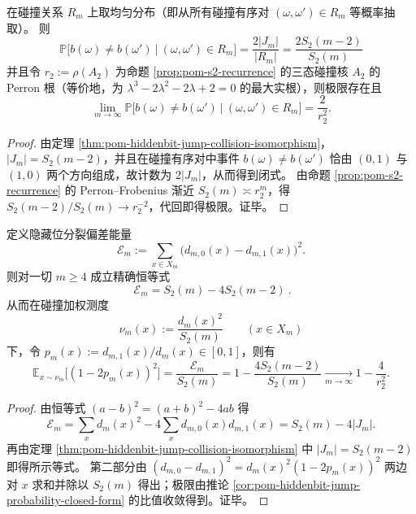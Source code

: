 \begin{corollary}[碰撞条件下的隐藏位跃迁概率闭式与代数极限]\label{cor:pom-hiddenbit-jump-probability-closed-form}
在碰撞关系 \(R_m\) 上取均匀分布（即从所有碰撞有序对 \((\omega,\omega')\in R_m\) 等概率抽取）。
则
\[
\boxed{\;
\mathbb{P}\bigl[b(\omega)\neq b(\omega')\ \big|\ (\omega,\omega')\in R_m\bigr]
=\frac{2|J_m|}{|R_m|}
=\frac{2S_2(m-2)}{S_2(m)}\;}
\]
并且令 \(r_2:=\rho(A_2)\) 为命题 \ref{prop:pom-s2-recurrence} 的三态碰撞核 \(A_2\) 的 Perron 根（等价地，为 \(\lambda^3-2\lambda^2-2\lambda+2=0\) 的最大实根），则极限存在且
\[
\lim_{m\to\infty}\mathbb{P}\bigl[b(\omega)\neq b(\omega')\ \big|\ (\omega,\omega')\in R_m\bigr]
=\frac{2}{r_2^2}.
\]
\end{corollary}
\begin{proof}
由定理 \ref{thm:pom-hiddenbit-jump-collision-isomorphism}，\(|J_m|=S_2(m-2)\)，并且在碰撞有序对中事件 \(b(\omega)\neq b(\omega')\) 恰由 \((0,1)\) 与 \((1,0)\) 两个方向组成，故计数为 \(2|J_m|\)，从而得到闭式。
由命题 \ref{prop:pom-s2-recurrence} 的 Perron--Frobenius 渐近 \(S_2(m)\asymp r_2^m\)，得 \(S_2(m-2)/S_2(m)\to r_2^{-2}\)，代回即得极限。证毕。
\end{proof}

\begin{theorem}[隐藏位分裂偏差能量的二阶守恒律]\label{thm:pom-hiddenbit-bias-energy-identity}
定义隐藏位分裂偏差能量
\[
\mathcal{E}_m:=\sum_{x\in X_m}\bigl(d_{m,0}(x)-d_{m,1}(x)\bigr)^2.
\]
则对一切 \(m\ge 4\) 成立精确恒等式
\[
\boxed{\ \mathcal{E}_m=S_2(m)-4S_2(m-2)\ }.
\]
从而在碰撞加权测度
\[
\nu_m(x):=\frac{d_m(x)^2}{S_2(m)}\qquad(x\in X_m)
\]
下，令 \(p_m(x):=d_{m,1}(x)/d_m(x)\in[0,1]\)，则有
\[
\mathbb{E}_{x\sim\nu_m}\bigl[(1-2p_m(x))^2\bigr]
=\frac{\mathcal{E}_m}{S_2(m)}
=1-\frac{4S_2(m-2)}{S_2(m)}
\xrightarrow[m\to\infty]{}
1-\frac{4}{r_2^2}.
\]
\end{theorem}
\begin{proof}
由恒等式 \((a-b)^2=(a+b)^2-4ab\) 得
\[
\mathcal{E}_m=\sum_x d_m(x)^2-4\sum_x d_{m,0}(x)d_{m,1}(x)=S_2(m)-4|J_m|.
\]
再由定理 \ref{thm:pom-hiddenbit-jump-collision-isomorphism} 中 \(|J_m|=S_2(m-2)\) 即得所示等式。
第二部分由
\(
(d_{m,0}-d_{m,1})^2=d_m(x)^2(1-2p_m(x))^2
\)
两边对 \(x\) 求和并除以 \(S_2(m)\) 得出；极限由推论 \ref{cor:pom-hiddenbit-jump-probability-closed-form} 的比值收敛得到。证毕。
\end{proof}

